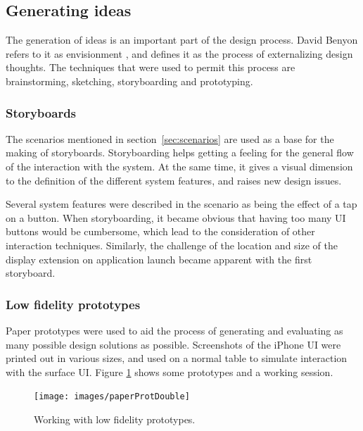 \subsection{Generating ideas}

The generation of ideas is an important part of the design process.
David Benyon refers to it as envisionment \citep{Benyon:2010}, and defines it as the process of externalizing design thoughts.
The techniques that were used to permit this process are brainstorming, sketching, storyboarding and prototyping.

\subsubsection{Storyboards}

The scenarios mentioned in section~\ref{sec:scenarios} are used as a base for the making of storyboards.
Storyboarding helps getting a feeling for the general flow of the interaction with the system.
At the same time, it gives a visual dimension to the definition of the different system features, and raises new design issues.

Several system features were described in the scenario as being the effect of a tap on a button.
When storyboarding, it became obvious that having too many UI buttons would be cumbersome, which lead to the consideration of other interaction techniques.
Similarly, the challenge of the location and size of the display extension on application launch became apparent with the first storyboard.

\subsubsection{Low fidelity prototypes}

Paper prototypes were used to aid the process of generating and evaluating as many possible design solutions as possible.
Screenshots of the iPhone UI \citep{iphone} were printed out in various sizes, and used on a normal table to simulate interaction with the surface UI.
Figure \ref{paperProt} shows some prototypes and a working session.

\begin{figure}[htb]
  \centering
    \texttt{[image: images/paperProtDouble]}
  \caption{Working with low fidelity prototypes.}
  \label{paperProt}
\end{figure}


